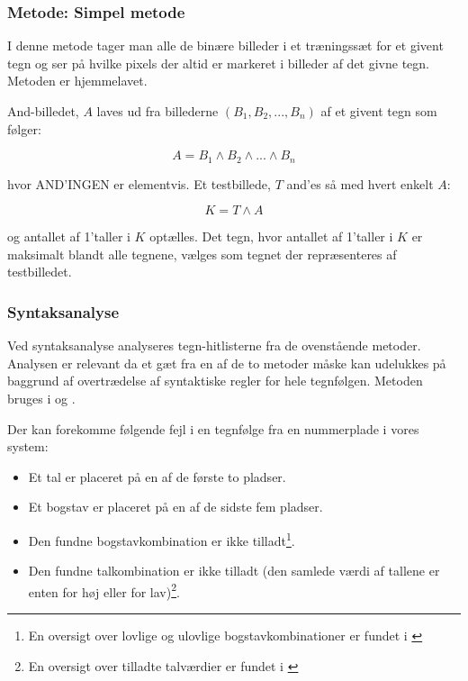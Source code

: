 \subsubsection{Metode: Simpel metode}

I denne metode tager man alle de binære billeder i et træningssæt for et givent tegn og ser på hvilke pixels der altid er markeret i billeder af det givne tegn. Metoden er hjemmelavet.

And-billedet, $A$ laves ud fra billederne $(B_{1},B_{2},...,B_{n})$ af et givent tegn som følger:

\begin{displaymath}
A = B_1 \wedge B_2 \wedge ... \wedge B_n
\end{displaymath}

hvor AND'INGEN er elementvis. Et testbillede, $T$ and'es så med hvert enkelt $A$:

\begin{displaymath}
K = T \wedge A
\end{displaymath}

og antallet af 1'taller i $K$ optælles. Det tegn, hvor antallet af 1'taller i $K$ er maksimalt blandt alle tegnene, vælges som tegnet der repræsenteres af testbilledet.

\subsubsection{Syntaksanalyse}

Ved syntaksanalyse analyseres tegn-hitlisterne fra de ovenstående metoder. Analysen er relevant da et gæt fra en af de to metoder måske kan udelukkes på baggrund af overtrædelse af syntaktiske regler for hele tegnfølgen. Metoden bruges i \cite{nijhuis} og \cite{kwas}.

Der kan forekomme følgende fejl i en tegnfølge fra en nummerplade i vores system:

\begin{itemize}
\item Et tal er placeret på en af de første to pladser.
\item Et bogstav er placeret på en af de sidste fem pladser.
\item Den fundne bogstavkombination er ikke tilladt\footnote{En oversigt over lovlige og ulovlige bogstavkombinationer er fundet i \cite{bogstav_komb}}.
\item Den fundne talkombination er ikke tilladt (den samlede værdi af tallene er enten for høj eller for lav)\footnote{En oversigt over tilladte talværdier er fundet i \cite{nrpl}}.
\end{itemize}

